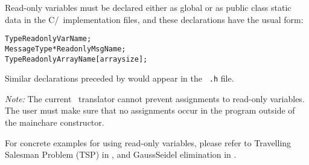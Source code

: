 Read-only variables must be declared either as global or as public class static
data in the C/\CC\ implementation files, and these declarations have the usual
form:

\begin{alltt}
 Type ReadonlyVarName;
 MessageType *ReadonlyMsgName;
 Type ReadonlyArrayName [arraysize];
\end{alltt}

Similar declarations preceded by  would appear in the {\tt
.h} file. 

{\it Note:}  The current \charmpp\ translator cannot prevent
assignments to read-only variables.  The user must make sure that no
assignments occur in the program outside of the mainchare constructor.

For concrete examples for using read-only variables, please refer to Travelling
Salesman Problem (TSP) in
, and GaussSeidel
elimination in .
